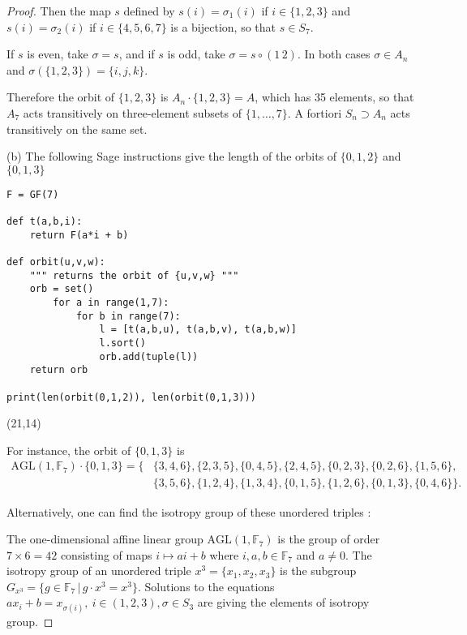 \documentclass[11pt,a4paper]{article}
\newcommand{\F}{\mathbb{F}}
\begin{document}
{\begin{proof}
Then the map $s$ defined by $s(i) = \sigma_{1}(i)$ if $i\in \{1,2,3\}$ and $s(i) = \sigma_2(i)$ if $i\in \{4,5,6,7\}$ is a bijection, so that $s \in S_7$. 

If $s$ is even, take $\sigma = s$, and if $s$ is odd, take $\sigma = s \circ (1\, 2)$. In both cases $\sigma \in A_n$ and $\sigma(\{1,2,3\}) = \{i,j,k\}$.

Therefore the orbit of $\{1,2,3\}$ is $A_n \cdot \{1,2,3\} = A$, which  has 35 elements, so that $A_7$ acts transitively on three-element subsets of $\{1,\ldots,7\}$. A fortiori $S_n \supset A_n$ acts transitively on the same set.

\item[(b)] 
The following Sage instructions give the length of the orbits of $\{0,1,2\}$ and $\{0,1,3\}$
\begin{verbatim}
F = GF(7)

def t(a,b,i):
    return F(a*i + b)
	
def orbit(u,v,w):
    """ returns the orbit of {u,v,w} """
    orb = set()
        for a in range(1,7):
            for b in range(7):
                l = [t(a,b,u), t(a,b,v), t(a,b,w)]
                l.sort()
                orb.add(tuple(l))
    return orb
	
print(len(orbit(0,1,2)), len(orbit(0,1,3)))
\end{verbatim}
\begin{center}
(21,14)
\end{center}
For instance, the orbit of $\{0,1,3\}$ is
\begin{align*}
\mathrm{AGL}(1,\F_7) \cdot \{0,1,3\} =\{&\{3, 4, 6\}, \{2, 3, 5\}, \{0, 4, 5\}, \{2, 4, 5\}, \{0, 2, 3\}, \{0, 2, 6\}, \{1, 5, 6\}, \\
&\{3, 5, 6\}, \{1, 2, 4\}, \{1, 3, 4\}, \{0, 1, 5\}, \{1, 2, 6\}, \{0, 1, 3\}, \{0, 4, 6\} \}.
\end{align*}

Alternatively, one can find the isotropy group of these unordered triples :

The one-dimensional affine linear group $\mathrm{AGL}(1,\mathbb{F}_7)$ is the group of order $7 \times 6=42$ consisting of maps $i\mapsto ai+b$ where $i,a,b \in \mathbb{F}_7$ and $a \ne 0$. The isotropy group of an unordered triple $x^3=\{x_1,x_2,x_3\}$ is the subgroup $G_{x^3}=\{g\in \mathbb{F}_7\, |\, g\cdot x^3=x^3\}$. Solutions to the equations $ax_i+b=x_{\sigma(i)},~i\in(1,2,3), \sigma \in S_3$ are giving the elements of isotropy group.


\end{proof}}
\end{document}
